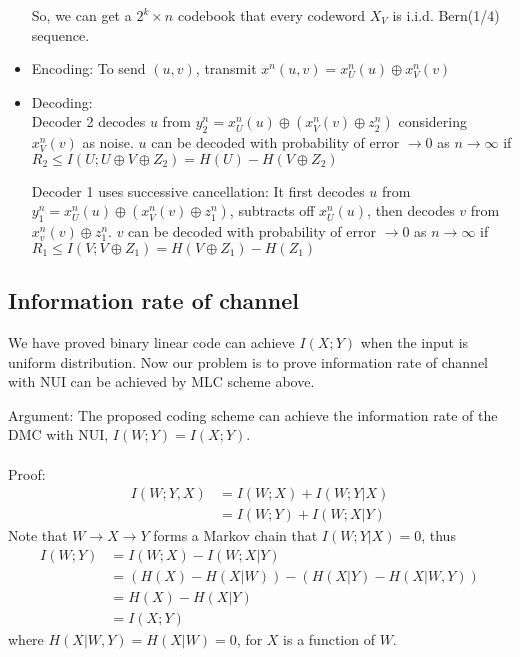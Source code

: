 \documentclass[12]{article}
\begin{document}
\begin{itemize}
So, we can get a $2^k\times n$ codebook that every codeword $X_V$ is i.i.d. Bern(1/4)
sequence.

\item Encoding: To send $(u,v)$, transmit $x^n(u,v)=x_U^n(u)\oplus x_V^n(v)$

\item Decoding: \\
Decoder 2 decodes $u$ from $y^n_2=x_U^n(u)\oplus (x_V^n(v)\oplus z^n_2)$ considering $x_V^n(v)$ as noise. $u$ can
be decoded with probability of error $\rightarrow 0$ as $n\rightarrow\infty$ if $R_2\leq I(U;U\oplus V\oplus Z_2)
=H(U)-H(V\oplus Z_2)$

Decoder 1 uses successive cancellation: It first decodes $u$ from $y^n_1=x_U^n(u)\oplus (x_V^n(v)\oplus z^n_1)$,
subtracts off $x_U^n(u)$, then decodes $v$ from $x_v^n(v)\oplus z^n_1$. $v$ can
be decoded with probability of error $\rightarrow 0$ as $n\rightarrow\infty$ if $R_1\leq I(V;V\oplus Z_1)
=H(V\oplus Z_1)-H(Z_1)$
\end{itemize}
\subsection*{Information rate of channel}
We have proved binary linear code can achieve $I(X;Y)$ when the input is uniform distribution. Now our problem is to prove
information rate of channel with NUI can be achieved by MLC scheme above.

Argument: The proposed coding scheme can achieve the information rate of the DMC with NUI, 
$I(W;Y)=I(X;Y)$.\\\\
Proof:
\begin{equation*}
	\begin{split}
		I(W;Y,X)&=I(W;X)+I(W;Y|X)\\
		&=I(W;Y)+I(W;X|Y)
	\end{split}
\end{equation*}
Note that $W\rightarrow X\rightarrow Y$ forms a Markov chain that $I(W;Y|X)=0$, thus
\begin{equation*}
	\begin{split}
		I(W;Y)&=I(W;X)-I(W;X|Y)\\
		&=(H(X)-H(X|W))-(H(X|Y)-H(X|W,Y))\\
		&=H(X)-H(X|Y)\\
		&=I(X;Y)
	\end{split}
\end{equation*}
where $H(X|W,Y)=H(X|W)=0$, for $X$ is a function of $W$.\\
\end{document}
